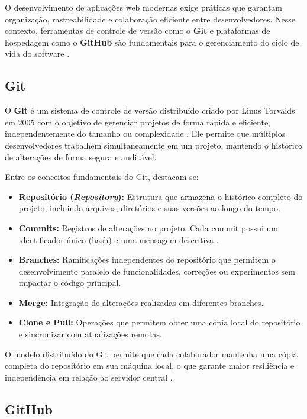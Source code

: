 O desenvolvimento de aplicações web modernas exige práticas que garantam organização, rastreabilidade e colaboração eficiente entre desenvolvedores. Nesse contexto, ferramentas de controle de versão como o \textbf{Git} e plataformas de hospedagem como o \textbf{GitHub} são fundamentais para o gerenciamento do ciclo de vida do software \cite{github_official}.

\subsection{Git}
\label{subsec:git}

O \textbf{Git} é um sistema de controle de versão distribuído criado por Linus Torvalds em 2005 com o objetivo de gerenciar projetos de forma rápida e eficiente, independentemente do tamanho ou complexidade \cite{chacon_git}. Ele permite que múltiplos desenvolvedores trabalhem simultaneamente em um projeto, mantendo o histórico de alterações de forma segura e auditável.

Entre os conceitos fundamentais do Git, destacam-se:

\begin{itemize}
\item \textbf{Repositório (\textit{Repository}):} Estrutura que armazena o histórico completo do projeto, incluindo arquivos, diretórios e suas versões ao longo do tempo.
\item \textbf{Commits:} Registros de alterações no projeto. Cada commit possui um identificador único (hash) e uma mensagem descritiva \cite{chacon_git}.
\item \textbf{Branches:} Ramificações independentes do repositório que permitem o desenvolvimento paralelo de funcionalidades, correções ou experimentos sem impactar o código principal.
\item \textbf{Merge:} Integração de alterações realizadas em diferentes branches.
\item \textbf{Clone e Pull:} Operações que permitem obter uma cópia local do repositório e sincronizar com atualizações remotas.
\end{itemize}

O modelo distribuído do Git permite que cada colaborador mantenha uma cópia completa do repositório em sua máquina local, o que garante maior resiliência e independência em relação ao servidor central \cite{chacon_git}.

\subsection{GitHub}
\label{subsec:github}


